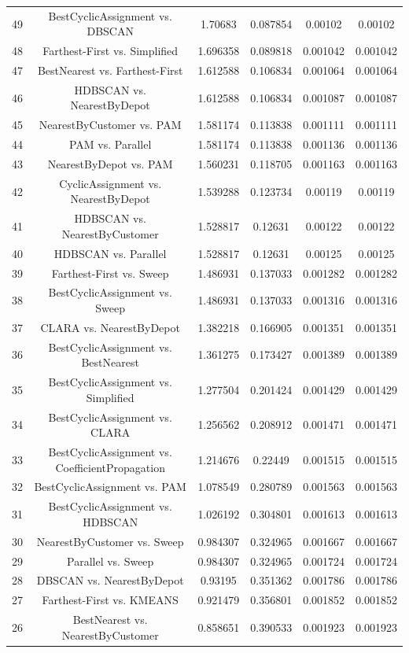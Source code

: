 \documentclass[a4paper,10pt]{article}
\begin{document}
\begin{landscape}
\begin{table}[!htp]
\begin{tabular}{cccccc}
49&BestCyclicAssignment vs. DBSCAN&1.70683&0.087854&0.00102&0.00102\\
48&Farthest-First vs. Simplified&1.696358&0.089818&0.001042&0.001042\\
47&BestNearest vs. Farthest-First&1.612588&0.106834&0.001064&0.001064\\
46&HDBSCAN vs. NearestByDepot&1.612588&0.106834&0.001087&0.001087\\
45&NearestByCustomer vs. PAM&1.581174&0.113838&0.001111&0.001111\\
44&PAM vs. Parallel&1.581174&0.113838&0.001136&0.001136\\
43&NearestByDepot vs. PAM&1.560231&0.118705&0.001163&0.001163\\
42&CyclicAssignment vs. NearestByDepot&1.539288&0.123734&0.00119&0.00119\\
41&HDBSCAN vs. NearestByCustomer&1.528817&0.12631&0.00122&0.00122\\
40&HDBSCAN vs. Parallel&1.528817&0.12631&0.00125&0.00125\\
39&Farthest-First vs. Sweep&1.486931&0.137033&0.001282&0.001282\\
38&BestCyclicAssignment vs. Sweep&1.486931&0.137033&0.001316&0.001316\\
37&CLARA vs. NearestByDepot&1.382218&0.166905&0.001351&0.001351\\
36&BestCyclicAssignment vs. BestNearest&1.361275&0.173427&0.001389&0.001389\\
35&BestCyclicAssignment vs. Simplified&1.277504&0.201424&0.001429&0.001429\\
34&BestCyclicAssignment vs. CLARA&1.256562&0.208912&0.001471&0.001471\\
33&BestCyclicAssignment vs. CoefficientPropagation&1.214676&0.22449&0.001515&0.001515\\
32&BestCyclicAssignment vs. PAM&1.078549&0.280789&0.001563&0.001563\\
31&BestCyclicAssignment vs. HDBSCAN&1.026192&0.304801&0.001613&0.001613\\
30&NearestByCustomer vs. Sweep&0.984307&0.324965&0.001667&0.001667\\
29&Parallel vs. Sweep&0.984307&0.324965&0.001724&0.001724\\
28&DBSCAN vs. NearestByDepot&0.93195&0.351362&0.001786&0.001786\\
27&Farthest-First vs. KMEANS&0.921479&0.356801&0.001852&0.001852\\
26&BestNearest vs. NearestByCustomer&0.858651&0.390533&0.001923&0.001923\\

\end{tabular}
\end{table}
\end{landscape}
\end{document}
